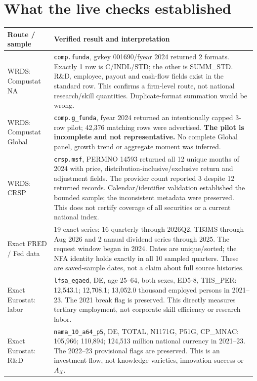 \documentclass[10pt,a4paper,landscape]{article}
\newcommand{\code}[1]{{\footnotesize\texttt{#1}}}
\begin{document}
\section{What the live checks established}
\begin{longtable}{@{}P{.22\textwidth}P{.72\textwidth}@{}}
\toprule{}\textbf{Route / sample} & \textbf{Verified result and interpretation}\\\midrule
WRDS: Compustat NA & \code{comp.funda}, gvkey 001690/fyear 2024 returned 2 formats. Exactly 1 row is C/INDL/STD; the other is SUMM\_STD. R\&D, employee, payout and cash-flow fields exist in the standard row. This confirms a firm-level route, not national research/skill quantities. Duplicate-format summation would be wrong.\\[6pt]
WRDS: Compustat Global & \code{comp.g\_funda}, fyear 2024 returned an intentionally capped 3-row pilot; 42,376 matching rows were advertised. \textbf{The pilot is incomplete and not representative.} No complete Global panel, growth trend or aggregate moment was inferred.\\[6pt]
WRDS: CRSP & \code{crsp.msf}, PERMNO 14593 returned all 12 unique months of 2024 with price, distribution-inclusive/exclusive return and adjustment fields. The provider count reported 3 despite 12 returned records. Calendar/identifier validation established the bounded sample; the inconsistent metadata were preserved. This does not certify coverage of all securities or a current national index.\\[6pt]
Exact FRED / Fed data & 19 exact series: 16 quarterly through 2026Q2, TB3MS through Aug 2026 and 2 annual dividend series through 2025. The request window began in 2024. Dates are unique/sorted; the NFA identity holds exactly in all 10 sampled quarters. These are saved-sample dates, not a claim about full source histories.\\[6pt]
Exact Eurostat: labor & \code{lfsa\_egaed}, DE, age 25--64, both sexes, ED5-8, THS\_PER: 12,543.1; 12,708.1; 13,052.0 thousand employed persons in 2021--23. The 2021 break flag is preserved. This directly measures tertiary employment, not corporate skill efficiency or research labor.\\[6pt]
Exact Eurostat: R\&D & \code{nama\_10\_a64\_p5}, DE, TOTAL, N1171G, P51G, CP\_MNAC: 105,966; 110,894; 124,513 million national currency in 2021--23. The 2022--23 provisional flags are preserved. This is an investment flow, not knowledge varieties, innovation success or $A_X$.\\[6pt]

\end{longtable}
\end{document}
